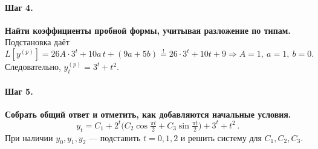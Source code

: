 \paragraph{Шаг 4.} \textbf{Найти коэффициенты пробной формы, учитывая разложение по типам.}\\
Подстановка даёт
\[
L[y^{(p)}]=26A\cdot 3^{t}+10a\,t+(9a+5b)\stackrel{!}{=}26\cdot 3^{t}+10t+9
\Rightarrow A=1,\ a=1,\ b=0.
\]
Следовательно, \(y^{(p)}_t=3^{t}+t^{2}\).

\paragraph{Шаг 5.} \textbf{Собрать общий ответ и отметить, как добавляются начальные условия.}\\
\[
\boxed{\,y_t=C_1+2^{t}\Big(C_2\cos\tfrac{\pi t}{2}+C_3\sin\tfrac{\pi t}{2}\Big)+3^{t}+t^{2}\, }.
\]
При наличии \(y_0,y_1,y_2\) — подставить \(t=0,1,2\) и решить систему для \(C_1,C_2,C_3\).
